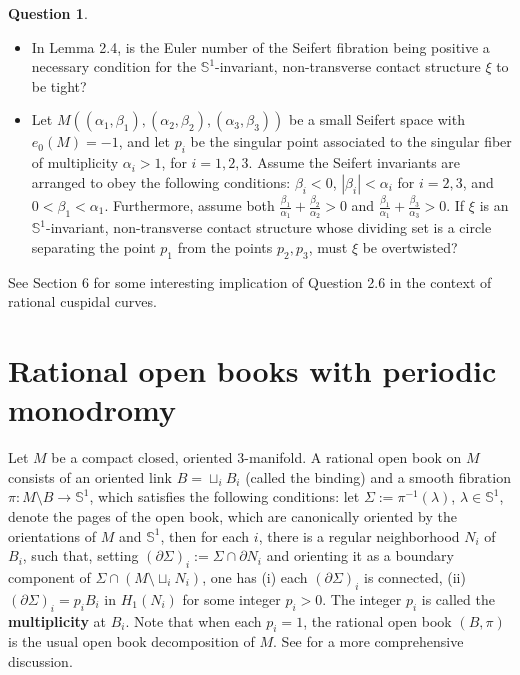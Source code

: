 \documentclass[11pt]{amsart}
\theoremstyle{plain}
\numberwithin{theorem}{section}
\theoremstyle{definition}
\newtheorem{question}[theorem]{Question}
\newcommand{\s}{{\mathbb S}}
\begin{document}
\begin{question}
\begin{itemize}
\item [{(1)}] In Lemma 2.4, is the Euler number of the Seifert fibration being positive a necessary condition for the 
$\s^1$-invariant, non-transverse contact structure $\xi$ to be tight?
\item [{(2)}] Let $M((\alpha_1,\beta_1), (\alpha_2,\beta_2), (\alpha_3,\beta_3))$ be a small Seifert space with
$e_0(M)=-1$, and let $p_i$ be the singular point associated to the singular fiber of multiplicity $\alpha_i>1$, 
for $i=1,2,3$. Assume the Seifert invariants are arranged to obey the following conditions: $\beta_i<0$, $|\beta_i|<\alpha_i$ for $i=2,3$, and $0<\beta_1<\alpha_1$. Furthermore, assume both 
$\frac{\beta_1}{\alpha_1}+\frac{\beta_2}{\alpha_2}>0$ and $\frac{\beta_1}{\alpha_1}+\frac{\beta_3}{\alpha_3}>0$. 
If $\xi$ is an $\s^1$-invariant, non-transverse contact structure whose dividing set is a circle separating the point 
$p_1$ from the points $p_2,p_3$, must $\xi$ be overtwisted?
\end{itemize}
\end{question}

See Section 6 for some interesting implication of Question 2.6 in the context of rational cuspidal curves. 


\section{Rational open books with periodic monodromy}

Let $M$ be a compact closed, oriented $3$-manifold. A rational open book on $M$ consists of an oriented link $B=\sqcup_i B_i$ (called the binding) and a smooth fibration $\pi: M\setminus B\rightarrow \s^1$, which satisfies the following conditions: let $\Sigma:=\pi^{-1}(\lambda)$, 
$\lambda\in\s^1$, denote the pages of the open book, which are canonically oriented by the orientations of $M$ and $\s^1$, then for each $i$, there is a regular neighborhood $N_i$ of $B_i$, such that, setting $(\partial \Sigma)_i:=\Sigma\cap \partial N_i$ and orienting it as a boundary component of $\Sigma\cap (M\setminus \sqcup_i N_i)$, one has (i) each $(\partial \Sigma)_i$ is connected, (ii) $(\partial \Sigma)_i=p_i B_i$ in $H_1(N_i)$ for some integer $p_i>0$. The integer $p_i$ is called the {\bf multiplicity} at $B_i$. Note that when each $p_i=1$, the rational open book $(B,\pi)$ is the usual open book decomposition of $M$. See \cite{BEV} for a more comprehensive discussion. 
\end{document}
